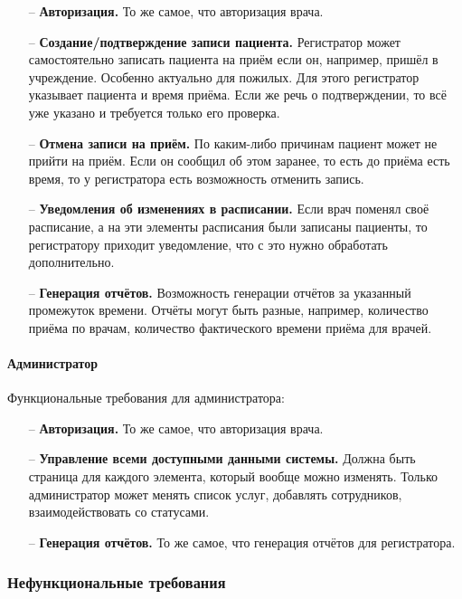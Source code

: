 \documentclass[a4paper,article]{article}
\begin{document}
\begin{sloppypar}
    \begin{itemize}[nolistsep]
        \item[--] \textbf{Авторизация.} То же самое, что авторизация врача.
        \item[--] \textbf{Создание/подтверждение записи пациента.} Регистратор может самостоятельно записать пациента на приём если он, например, пришёл в учреждение. Особенно актуально для пожилых. Для этого регистратор указывает пациента и время приёма. Если же речь о подтверждении, то всё уже указано и требуется только его проверка.
        \item[--] \textbf{Отмена записи на приём.} По каким-либо причинам пациент может не прийти на приём. Если он сообщил об этом заранее, то есть до приёма есть время, то у регистратора есть возможность отменить запись.
        \item[--] \textbf{Уведомления об изменениях в расписании.} Если врач поменял своё расписание, а на эти элементы расписания были записаны пациенты, то регистратору приходит уведомление, что с это нужно обработать дополнительно.
        \item[--] \textbf{Генерация отчётов.} Возможность генерации отчётов за указанный промежуток времени. Отчёты могут быть разные, например, количество приёма по врачам, количество фактического времени приёма для врачей.
    \end{itemize}

    \paragraph{Администратор}\label{ТЗ. Администратор}

    Функциональные требования для администратора:

    \begin{itemize}[nolistsep]
        \item[--] \textbf{Авторизация.} То же самое, что авторизация врача.
        \item[--] \textbf{Управление всеми доступными данными системы.} Должна быть страница для каждого элемента, который вообще можно изменять. Только администратор может менять список услуг, добавлять сотрудников, взаимодействовать со статусами.
        \item[--] \textbf{Генерация отчётов.} То же самое, что генерация отчётов для регистратора.
    \end{itemize}

    \newpage

    \subsubsection{Нефункциональные требования}


\end{sloppypar}
\end{document}
